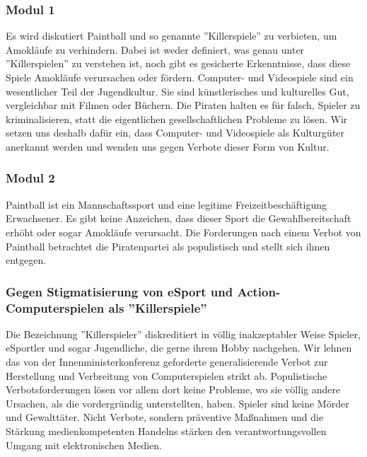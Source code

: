 \subsubsection{Modul 1}
\abstimmung
Es wird diskutiert Paintball und so genannte ''Killerspiele'' zu verbieten, um Amokläufe zu verhindern. Dabei ist weder definiert, was genau unter ''Killerspielen'' zu verstehen ist, noch gibt es gesicherte Erkenntnisse, dass diese Spiele Amokläufe verursachen oder fördern. Computer- und Videospiele sind ein wesentlicher Teil der Jugendkultur. Sie sind künstlerisches und kulturelles Gut, vergleichbar mit Filmen oder Büchern. Die Piraten halten es für falsch, Spieler zu kriminalisieren, statt die eigentlichen gesellschaftlichen Probleme zu lösen. Wir setzen uns deshalb dafür ein, dass Computer- und Videospiele als Kulturgüter anerkannt werden und wenden uns gegen Verbote dieser Form von Kultur.

\subsubsection{Modul 2}
\abstimmung
Paintball ist ein Mannschaftssport und eine legitime Freizeitbeschäftigung Erwachsener. Es gibt keine Anzeichen, dass dieser Sport die Gewahlbereitschaft erhöht oder sogar Amokläufe verursacht. Die Forderungen nach einem Verbot von Paintball betrachtet die Piratenpartei als populistisch und stellt sich ihnen entgegen.
 


\subsubsection{Gegen Stigmatisierung von eSport und Action-Computerspielen als ''Killerspiele''} 
\abstimmung
Die Bezeichnung ''Killerspieler'' diskreditiert in völlig inakzeptabler Weise Spieler, eSportler und sogar Jugendliche, die gerne ihrem Hobby nachgehen. Wir lehnen das von der Innenministerkonferenz geforderte generalisierende Verbot zur Herstellung und Verbreitung von Computerspielen strikt ab. Populistische Verbotsforderungen lösen vor allem dort keine Probleme, wo sie völlig andere Ursachen, als die vordergründig unterstellten, haben. Spieler sind keine Mörder und Gewalttäter. Nicht Verbote, sondern präventive Maßnahmen und die Stärkung medienkompetenten Handelns stärken den verantwortungsvollen Umgang mit elektronischen Medien.
 
